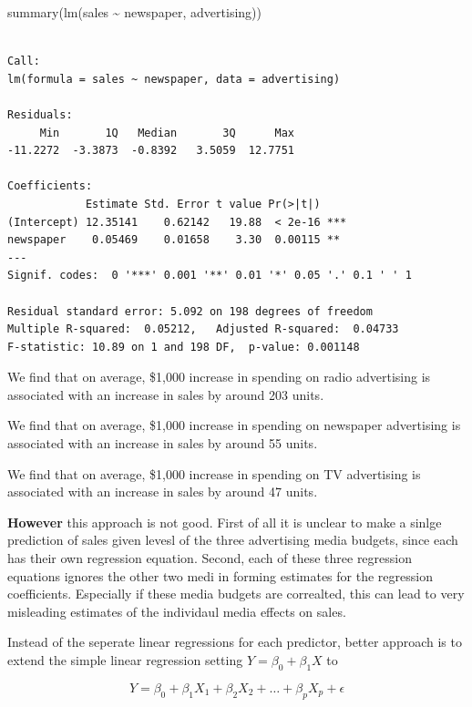 \documentclass[
  letterpaper,
  DIV=11,
  numbers=noendperiod]{scrreprt}
\newenvironment{Shaded}{\begin{snugshade}}{\end{snugshade}}
\newcommand{\FunctionTok}[1]{\textcolor[rgb]{0.02,0.16,0.49}{#1}}
\newcommand{\NormalTok}[1]{\textcolor[rgb]{0.33,0.33,0.33}{#1}}
\newcommand{\SpecialCharTok}[1]{\textcolor[rgb]{0.00,0.46,0.62}{#1}}
\begin{document}
\begin{Shaded}
\begin{Highlighting}[]
\FunctionTok{summary}\NormalTok{(}\FunctionTok{lm}\NormalTok{(sales }\SpecialCharTok{\textasciitilde{}}\NormalTok{ newspaper, advertising))}
\end{Highlighting}
\end{Shaded}

\begin{verbatim}

Call:
lm(formula = sales ~ newspaper, data = advertising)

Residuals:
     Min       1Q   Median       3Q      Max 
-11.2272  -3.3873  -0.8392   3.5059  12.7751 

Coefficients:
            Estimate Std. Error t value Pr(>|t|)    
(Intercept) 12.35141    0.62142   19.88  < 2e-16 ***
newspaper    0.05469    0.01658    3.30  0.00115 ** 
---
Signif. codes:  0 '***' 0.001 '**' 0.01 '*' 0.05 '.' 0.1 ' ' 1

Residual standard error: 5.092 on 198 degrees of freedom
Multiple R-squared:  0.05212,   Adjusted R-squared:  0.04733 
F-statistic: 10.89 on 1 and 198 DF,  p-value: 0.001148
\end{verbatim}

We find that on average, \$1,000 increase in spending on radio
advertising is associated with an increase in sales by around 203 units.

We find that on average, \$1,000 increase in spending on newspaper
advertising is associated with an increase in sales by around 55 units.

We find that on average, \$1,000 increase in spending on TV advertising
is associated with an increase in sales by around 47 units.

\textbf{However} this approach is not good. First of all it is unclear
to make a sinlge prediction of sales given levesl of the three
advertising media budgets, since each has their own regression equation.
Second, each of these three regression equations ignores the other two
medi in forming estimates for the regression coefficients. Especially if
these media budgets are correalted, this can lead to very misleading
estimates of the individaul media effects on sales.

Instead of the seperate linear regressions for each predictor, better
approach is to extend the simple linear regression setting
\(Y = \beta_0 + \beta_1 X\) to

\[
Y = \beta_0 + \beta_1 X_1 + \beta_2 X_2 + \dots + \beta_p X_p + \epsilon
\]
\end{document}
